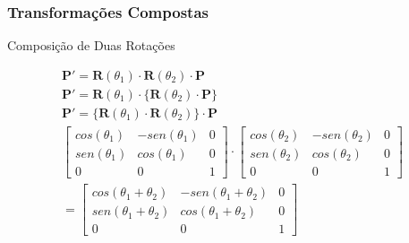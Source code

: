 \documentclass{beamer}
\begin{document}
\begin{frame}
\frametitle{Transformações Compostas}
	\begin{block}{Composição de Duas Rotações}
		
			
		\begin{eqnarray*}
			\textbf{P}' = \textbf{R}(\theta_1) \cdot \textbf{R}(\theta_2) \cdot \textbf{P} \\
			\textbf{P}' = \textbf{R}(\theta_1) \cdot \{\textbf{R}(\theta_2) \cdot \textbf{P} \} \\
			\textbf{P}' = \{\textbf{R}(\theta_1) \cdot \textbf{R}(\theta_2) \} \cdot \textbf{P}  \\
			\begin{bmatrix}
					cos(\theta_1)	& -sen (\theta_1) 	& 0 \\
					sen(\theta_1) 	& cos(\theta_1)	& 0 \\
					0	& 0	& 1
			\end{bmatrix}
			\cdot \begin{bmatrix}
					cos(\theta_2)	& -sen (\theta_2) 	& 0 \\
					sen(\theta_2) 	& cos(\theta_2)		& 0 \\
					0	& 0	& 1
			\end{bmatrix} \\
			= \begin{bmatrix}
					cos(\theta_1 +\theta_2)	& -sen (\theta_1 +\theta_2) 	& 0 \\
					sen(\theta_1 +\theta_2) 	& cos(\theta_1 +\theta_2)	& 0 \\
					0	& 0	& 1
			\end{bmatrix}
		\end{eqnarray*}
				

	\end{block}
\end{frame}
\end{document}
